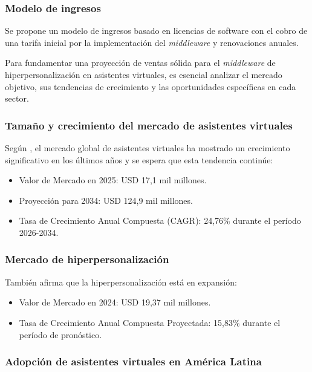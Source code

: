 \subsubsection{Modelo de ingresos}

Se propone un modelo de ingresos basado en licencias de software con el cobro de una tarifa inicial por la implementación del \textit{middleware} y renovaciones anuales.

Para fundamentar una proyección de ventas sólida para el \textit{middleware} de hiperpersonalización en asistentes virtuales, es esencial analizar el mercado objetivo, sus tendencias de crecimiento y las oportunidades específicas en cada sector.

\subsubsection{Tamaño y crecimiento del mercado de asistentes virtuales}

Según \textcite{IMARCIVA2024}, el mercado global de asistentes virtuales ha mostrado un crecimiento significativo en los últimos años y se espera que esta tendencia continúe:

\begin{itemize}
    \item Valor de Mercado en 2025: USD 17,1 mil millones.
    \item Proyección para 2034: USD 124,9 mil millones.
    \item Tasa de Crecimiento Anual Compuesta (CAGR): 24,76\% durante el período 2026-2034.
\end{itemize}

\subsubsection{Mercado de hiperpersonalización}

También \textcite{emergen_hyperpersonalization_2024} afirma que la hiperpersonalización está en expansión:

\begin{itemize}
    \item Valor de Mercado en 2024: USD 19,37 mil millones.
    \item Tasa de Crecimiento Anual Compuesta Proyectada: 15,83\% durante el período de pronóstico.
\end{itemize}

\subsubsection{Adopción de asistentes virtuales en América Latina}

